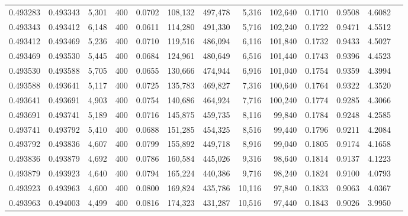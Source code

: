 \begin{tabular}{rrrrrrrrrrrrr}
0.493283 & 0.493343 &  5,301 & 400 &                                     0.0702 & 108,132 & 497,478 &   5,316 & 102,640 & 0.1710 & 0.9508 & 4.6082 \\
0.493343 & 0.493412 &  6,148 & 400 &                                     0.0611 & 114,280 & 491,330 &   5,716 & 102,240 & 0.1722 & 0.9471 & 4.5512 \\
0.493412 & 0.493469 &  5,236 & 400 &                                     0.0710 & 119,516 & 486,094 &   6,116 & 101,840 & 0.1732 & 0.9433 & 4.5027 \\
0.493469 & 0.493530 &  5,445 & 400 &                                     0.0684 & 124,961 & 480,649 &   6,516 & 101,440 & 0.1743 & 0.9396 & 4.4523 \\
0.493530 & 0.493588 &  5,705 & 400 &                                     0.0655 & 130,666 & 474,944 &   6,916 & 101,040 & 0.1754 & 0.9359 & 4.3994 \\
0.493588 & 0.493641 &  5,117 & 400 &                                     0.0725 & 135,783 & 469,827 &   7,316 & 100,640 & 0.1764 & 0.9322 & 4.3520 \\
0.493641 & 0.493691 &  4,903 & 400 &                                     0.0754 & 140,686 & 464,924 &   7,716 & 100,240 & 0.1774 & 0.9285 & 4.3066 \\
0.493691 & 0.493741 &  5,189 & 400 &                                     0.0716 & 145,875 & 459,735 &   8,116 &  99,840 & 0.1784 & 0.9248 & 4.2585 \\
0.493741 & 0.493792 &  5,410 & 400 &                                     0.0688 & 151,285 & 454,325 &   8,516 &  99,440 & 0.1796 & 0.9211 & 4.2084 \\
0.493792 & 0.493836 &  4,607 & 400 &                                     0.0799 & 155,892 & 449,718 &   8,916 &  99,040 & 0.1805 & 0.9174 & 4.1658 \\
0.493836 & 0.493879 &  4,692 & 400 &                                     0.0786 & 160,584 & 445,026 &   9,316 &  98,640 & 0.1814 & 0.9137 & 4.1223 \\
0.493879 & 0.493923 &  4,640 & 400 &                                     0.0794 & 165,224 & 440,386 &   9,716 &  98,240 & 0.1824 & 0.9100 & 4.0793 \\
0.493923 & 0.493963 &  4,600 & 400 &                                     0.0800 & 169,824 & 435,786 &  10,116 &  97,840 & 0.1833 & 0.9063 & 4.0367 \\
0.493963 & 0.494003 &  4,499 & 400 &                                     0.0816 & 174,323 & 431,287 &  10,516 &  97,440 & 0.1843 & 0.9026 & 3.9950 \\

\end{tabular}
